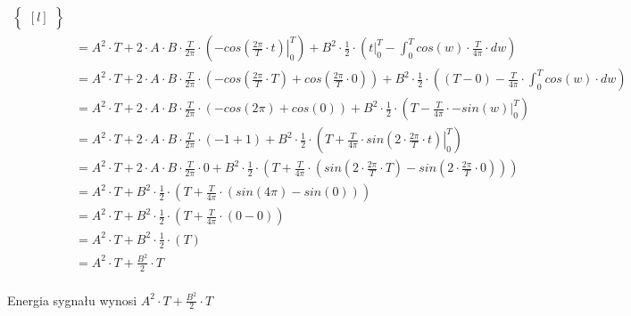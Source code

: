 \begin{task}
\begin{align*}
\begin{Bmatrix*}[l]
 \end{Bmatrix*}\\
 &=A^2 \cdot T + 2\cdot A \cdot B \cdot \frac{T}{2\pi} \cdot \left( \left.-cos\left(\frac{2\pi}{T} \cdot t \right)\right|_{0}^{T}  \right) + B^2 \cdot \frac{1}{2}\cdot \left( \left. t \right|_{0}^{T} - \int_{0}^{T} cos\left(w \right)  \cdot \frac{T}{4\pi} \cdot dw \right)\\
 &=A^2 \cdot T + 2\cdot A \cdot B \cdot \frac{T}{2\pi} \cdot  \left(-cos\left(\frac{2\pi}{T} \cdot T \right)+cos\left(\frac{2\pi}{T} \cdot 0 \right)\right) + B^2 \cdot \frac{1}{2} \cdot \left( \left(T - 0 \right) - \frac{T}{4\pi} \cdot \int_{0}^{T} cos\left(w \right)  \cdot dw \right)\\
 &=A^2 \cdot T + 2\cdot A \cdot B \cdot \frac{T}{2\pi} \cdot  \left(-cos\left(2\pi \right)+cos\left(0 \right)\right) + B^2 \cdot \frac{1}{2} \cdot \left( T - \frac{T}{4\pi} \cdot \left. -sin\left(w \right)  \right|_{0}^{T} \right)\\
 &=A^2 \cdot T + 2\cdot A \cdot B \cdot \frac{T}{2\pi} \cdot  \left(-1+1\right) + B^2 \cdot \frac{1}{2} \cdot \left( T + \frac{T}{4\pi} \cdot \left. sin\left(2\cdot \frac{2\pi}{T}\cdot t \right)  \right|_{0}^{T} \right)\\
 &=A^2 \cdot T + 2\cdot A \cdot B \cdot \frac{T}{2\pi} \cdot 0 + B^2 \cdot \frac{1}{2} \cdot \left( T + \frac{T}{4\pi} \cdot \left( sin\left(2\cdot \frac{2\pi}{T}\cdot T \right) - sin\left(2\cdot \frac{2\pi}{T}\cdot 0 \right) \right) \right)\\
 &=A^2 \cdot T + B^2 \cdot \frac{1}{2} \cdot \left( T + \frac{T}{4\pi} \cdot \left( sin\left(4\pi \right) - sin\left( 0 \right) \right) \right)\\
 &=A^2 \cdot T + B^2 \cdot \frac{1}{2} \cdot \left( T + \frac{T}{4\pi} \cdot \left( 0 - 0 \right) \right)\\
 &=A^2 \cdot T + B^2 \cdot \frac{1}{2} \cdot \left( T \right)\\
 &=A^2 \cdot T + \frac{B^2}{2} \cdot T\\
\end{align*}

Energia sygnału wynosi $A^2 \cdot T + \frac{B^2}{2} \cdot T$
\end{task}